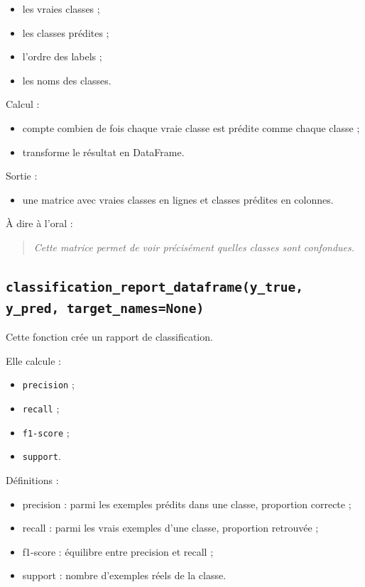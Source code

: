 \documentclass[11pt,a4paper]{article}
\begin{document}
\begin{itemize}
\item les vraies classes ;
\item les classes prédites ;
\item l'ordre des labels ;
\item les noms des classes.
\end{itemize}

Calcul :

\begin{itemize}
\item compte combien de fois chaque vraie classe est prédite comme chaque classe ;
\item transforme le résultat en DataFrame.
\end{itemize}

Sortie :

\begin{itemize}
\item une matrice avec vraies classes en lignes et classes prédites en colonnes.
\end{itemize}

À dire à l'oral :

\begin{quote}
\itshape Cette matrice permet de voir précisément quelles classes sont confondues.
\end{quote}

\subsection{\texttt{classification\_report\_dataframe(y\_true, y\_pred, target\_names=None)}}

Cette fonction crée un rapport de classification.

Elle calcule :

\begin{itemize}
\item \texttt{precision} ;
\item \texttt{recall} ;
\item \texttt{f1-score} ;
\item \texttt{support}.
\end{itemize}

Définitions :

\begin{itemize}
\item precision : parmi les exemples prédits dans une classe, proportion correcte ;
\item recall : parmi les vrais exemples d'une classe, proportion retrouvée ;
\item f1-score : équilibre entre precision et recall ;
\item support : nombre d'exemples réels de la classe.
\end{itemize}
\end{document}

